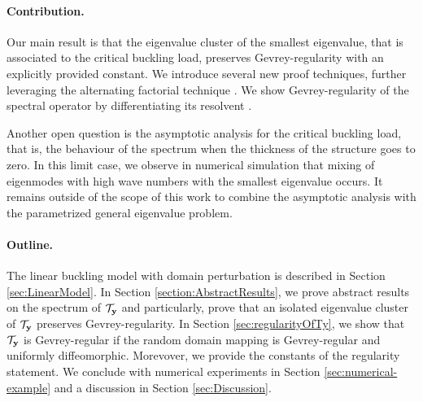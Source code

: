 \paragraph{Contribution.}
Our main result is that the
eigenvalue cluster of the smallest eigenvalue, that is associated to the critical buckling load, 
preserves Gevrey-regularity with an explicitly provided constant.
We introduce several new proof techniques, 
further leveraging the alternating factorial 
technique \cite{chernov2024analyticgevreyclassregularity}. 
We show Gevrey-regularity of the spectral operator by differentiating
its resolvent \cite{kato1995perturbation}. 

Another open question is the asymptotic analysis 
for the critical buckling load, that is, the 
behaviour of the spectrum when the thickness of 
the structure goes to zero. In this limit case, 
we observe in numerical simulation that mixing 
of eigenmodes with high wave numbers with the 
smallest eigenvalue occurs. It remains outside 
of the scope of this work to combine the 
asymptotic analysis with the parametrized 
general eigenvalue problem.






\paragraph{Outline.}
The linear buckling model with domain perturbation is described in Section \ref{sec:LinearModel}. 
In Section \ref{section:AbstractResults}, we prove abstract results on the 
spectrum of $\mathcal{T}_{\mathbf{y}}$ and particularly, prove that an isolated 
eigenvalue cluster of $\mathcal{T}_{\mathbf{y}}$ preserves Gevrey-regularity. %
In Section \ref{sec:regularityOfTy}, we show that $\mathcal{T}_{\mathbf{y}}$ is 
Gevrey-regular if the random domain mapping is Gevrey-regular and uniformly 
diffeomorphic. Morevover, we provide the constants of the regularity statement. 
We conclude with numerical experiments in Section 
\ref{sec:numerical-example} and a discussion in Section \ref{sec:Discussion}.




